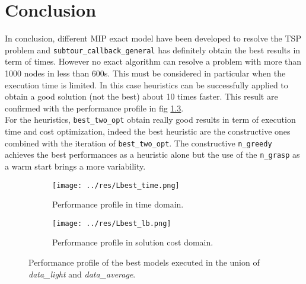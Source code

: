 \chapter{Conclusion}
In conclusion, different MIP exact model have been developed to resolve the TSP problem and \texttt{subtour\_callback\_general} has definitely obtain the best results in term of times. However no exact algorithm can resolve a problem with more than 1000 nodes in less than 600s. This must be considered in particular when the execution time is limited. In this case heuristics can be successfully applied to obtain a good solution (not the best) about 10 times faster. This result are confirmed with the performance profile in fig \ref{fig:pp_Lbest}.\\
For the heuristics, \texttt{best\_two\_opt} obtain really good results in term of execution time and cost optimization, indeed the best heuristic are the constructive ones combined with the iteration of \texttt{best\_two\_opt}.
The constructive \texttt{n\_greedy} achieves the best performances as a heuristic alone but the use of the \texttt{n\_grasp} as a warm start brings a more variability.
\begin{figure}[!h]
	\centering
	\begin{subfigure}{.49\textwidth}
		\centering
		\texttt{[image: ../res/Lbest\_time.png]}
		\caption{Performance profile in time domain.}
		\label{fig:Lbest_time}
	\end{subfigure}
\hfill
	\begin{subfigure}{.49\textwidth}
		\centering
		\texttt{[image: ../res/Lbest\_lb.png]}
		\caption{Performance profile in solution cost domain.}
		\label{fig:Lbest_lb}
	\end{subfigure}
	\caption{Performance profile of the best models executed in the union of \textit{data\_light} and \textit{data\_average}.}
	\label{fig:pp_Lbest}
\end{figure}